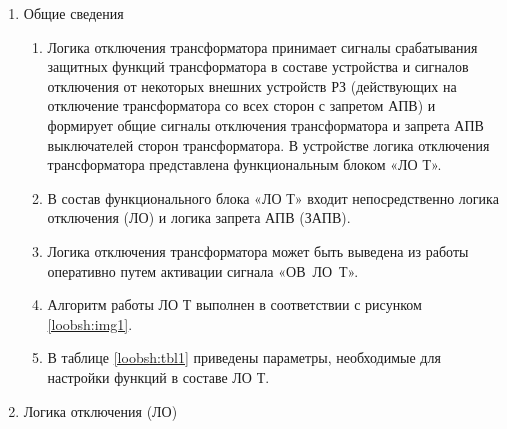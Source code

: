 
\color{black}

\begin{enumerate}

\item Общие сведения

\begin{enumerate}

\item
Логика отключения трансформатора принимает сигналы срабатывания защитных функций трансформатора в составе устройства и сигналов отключения от некоторых внешних устройств РЗ (действующих на отключение трансформатора со всех сторон с запретом АПВ) и формирует общие сигналы отключения трансформатора и запрета АПВ выключателей сторон трансформатора. В устройстве логика отключения трансформатора представлена функциональным блоком «ЛО Т».

\item
В состав функционального блока «ЛО Т» входит непосредственно логика отключения (ЛО) и логика запрета АПВ (ЗАПВ).


\item
Логика отключения трансформатора может быть выведена из работы оперативно путем активации сигнала «ОВ~ЛО~Т».

\item
Алгоритм работы ЛО Т выполнен в соответствии с рисунком \ref{loobsh:img1}.
\item
В таблице \ref{loobsh:tbl1} приведены параметры, необходимые для настройки функций в составе ЛО Т.


\end{enumerate}

\item Логика отключения (ЛО)
\begin{enumerate}


\end{enumerate}
\end{enumerate}

